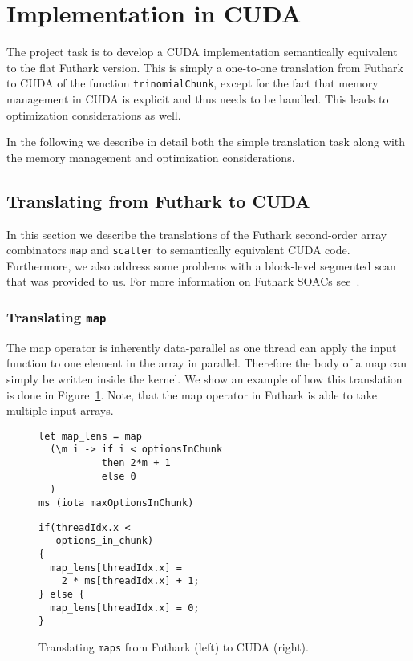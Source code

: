 \section{Implementation in CUDA}

The project task is to develop a CUDA implementation
semantically equivalent to the flat Futhark version. This is
simply a one-to-one translation from Futhark to CUDA of the
function \texttt{trinomialChunk}, except for the fact that
memory management in CUDA is explicit and thus needs to be
handled. This leads to optimization considerations as well.

In the following we describe in detail both the simple
translation task along with the memory management and
optimization considerations.


\subsection{Translating from Futhark to CUDA}

In this section we describe the translations of the Futhark
second-order array combinators \texttt{map} and
\texttt{scatter} to semantically equivalent CUDA
code. Furthermore, we also address some problems with a
block-level segmented scan that was provided to us. For more
information on Futhark SOACs see~\cite{futharkdoc}.

\subsubsection{Translating \texttt{map}}

The map operator is inherently data-parallel as one thread
can apply the input function to one element in the array in
parallel. Therefore the body of a map can simply be written
inside the kernel. We show an example of how this
translation is done in Figure~\ref{fig:trans_map}. Note,
that the map operator in Futhark is able to take multiple
input arrays.
%
\begin{figure}[bt]
\begin{center}
\begin{minipage}[t]{0.45\linewidth}
\vspace{0pt}
\begin{lstlisting}
let map_lens = map
  (\m i -> if i < optionsInChunk
           then 2*m + 1
           else 0
  )
ms (iota maxOptionsInChunk)
\end{lstlisting}
\end{minipage}
\begin{minipage}[t]{0.45\linewidth}
\vspace{0pt}
\begin{lstlisting}
if(threadIdx.x <
   options_in_chunk)
{
  map_lens[threadIdx.x] =
    2 * ms[threadIdx.x] + 1;
} else {
  map_lens[threadIdx.x] = 0;
}
\end{lstlisting}
\end{minipage}
\caption{Translating \texttt{maps} from Futhark (left) to
  CUDA (right).}
\label{fig:trans_map}
\end{center}
\end{figure}
%




